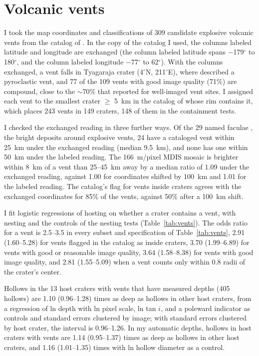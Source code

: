 \documentclass{planetary}
\begin{document}
\clearpage


\section{Volcanic vents}
\label{sec:ventsS}

I took the map coordinates and classifications of 309 candidate explosive volcanic vents from the catalog of \textcite{pegg2021}. In the copy of the catalog I used, the columns labeled latitude and longitude are exchanged (the column labeled latitude spans $-$179$^\circ$ to 180$^\circ$, and the column labeled longitude $-$77$^\circ$ to 62$^\circ$). With the columns exchanged, a vent falls in Tyagaraja crater (4$^\circ$N, 211$^\circ$E), where \textcite{lucchetti2021} described a pyroclastic vent, and 77 of the 109 vents with good image quality (71\%) are compound, close to the $\sim$70\% that \textcite{pegg2021} reported for well-imaged vent sites. I assigned each vent to the smallest crater $\geq$ 5~km in the catalog of \textcite{herrick2018} whose rim contains it, which places 243 vents in 149 craters, 148 of them in the containment tests.

I checked the exchanged reading in three further ways. Of the 29 named faculae \parencite{iau_gazetteer}, the bright deposits around explosive vents, 24 have a cataloged vent within 25~km under the exchanged reading (median 9.5~km), and none has one within 50~km under the labeled reading. The 166~m/pixel MDIS mosaic \parencite{denevi2018} is brighter within 8~km of a vent than 25--45~km away by a median ratio of 1.09 under the exchanged reading, against 1.00 for coordinates shifted by 100~km and 1.01 for the labeled reading. The catalog's flag for vents inside craters agrees with the exchanged coordinates for 85\% of the vents, against 50\% after a 100~km shift.

I fit logistic regressions of hosting on whether a crater contains a vent, with nesting and the controls of the nesting tests (Table~\ref{tab:vents}). The odds ratio for a vent is 2.5--3.5 in every subset and specification of Table~\ref{tab:vents}, 2.91 (1.60--5.28) for vents flagged in the catalog as inside craters, 3.70 (1.99--6.89) for vents with good or reasonable image quality, 3.64 (1.58--8.38) for vents with good image quality, and 2.81 (1.55--5.09) when a vent counts only within 0.8 radii of the crater's center.

Hollows in the 13 host craters with vents that have measured depths (405 hollows) are 1.10 (0.96--1.28) times as deep as hollows in other host craters, from a regression of ln depth with ln pixel scale, ln tan $i$, and a poleward indicator as controls and standard errors clustered by image; with standard errors clustered by host crater, the interval is 0.96--1.26. In my automatic depths, hollows in host craters with vents are 1.14 (0.95--1.37) times as deep as hollows in other host craters, and 1.16 (1.01--1.35) times with ln hollow diameter as a control.
\end{document}
